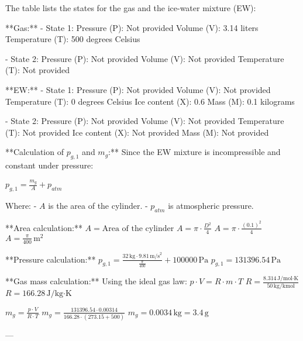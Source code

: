 The table lists the states for the gas and the ice-water mixture (EW):  

**Gas:**  
- State 1:  
  Pressure (P): Not provided  
  Volume (V): 3.14 liters  
  Temperature (T): 500 degrees Celsius  

- State 2:  
  Pressure (P): Not provided  
  Volume (V): Not provided  
  Temperature (T): Not provided  

**EW:**  
- State 1:  
  Pressure (P): Not provided  
  Volume (V): Not provided  
  Temperature (T): 0 degrees Celsius  
  Ice content (X): 0.6  
  Mass (M): 0.1 kilograms  

- State 2:  
  Pressure (P): Not provided  
  Volume (V): Not provided  
  Temperature (T): Not provided  
  Ice content (X): Not provided  
  Mass (M): Not provided  

**Calculation of \( p_{g,1} \) and \( m_g \):**  
Since the EW mixture is incompressible and constant under pressure:  

\( p_{g,1} = \frac{m_g}{A} + p_{atm} \)  

Where:  
- \( A \) is the area of the cylinder.  
- \( p_{atm} \) is atmospheric pressure.  

**Area calculation:**  
\( A = \text{Area of the cylinder} \)  
\( A = \pi \cdot \frac{D^2}{4} \)  
\( A = \pi \cdot \frac{(0.1)^2}{4} \)  
\( A = \frac{\pi}{400} \, \text{m}^2 \)  

**Pressure calculation:**  
\( p_{g,1} = \frac{32 \, \text{kg} \cdot 9.81 \, \text{m/s}^2}{\frac{\pi}{400}} + 100000 \, \text{Pa} \)  
\( p_{g,1} = 131396.54 \, \text{Pa} \)  

**Gas mass calculation:**  
Using the ideal gas law:  
\( p \cdot V = R \cdot m \cdot T \)  
\( R = \frac{8.314 \, \text{J/mol·K}}{50 \, \text{kg/kmol}} \)  
\( R = 166.28 \, \text{J/kg·K} \)  

\( m_g = \frac{p \cdot V}{R \cdot T} \)  
\( m_g = \frac{131396.54 \cdot 0.00314}{166.28 \cdot (273.15 + 500)} \)  
\( m_g = 0.0034 \, \text{kg} = 3.4 \, \text{g} \)  

---